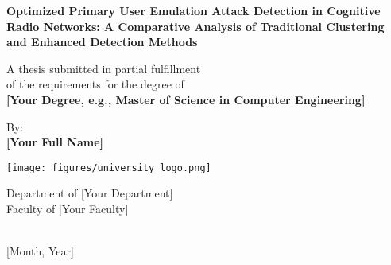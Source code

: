 \begin{titlepage}
    \begin{center}
        \vspace*{1cm}
        
        \Huge
        \textbf{Optimized Primary User Emulation Attack Detection in Cognitive Radio Networks: A Comparative Analysis of Traditional Clustering and Enhanced Detection Methods}
        
        \vspace{1.5cm}
        
        \Large
        A thesis submitted in partial fulfillment\\
        of the requirements for the degree of\\
        \textbf{[Your Degree, e.g., Master of Science in Computer Engineering]}
        
        \vspace{1.5cm}
        
        \Large
        By:\\
        \textbf{[Your Full Name]}
        
        \vfill
        
        \texttt{[image: figures/university\_logo.png]}
        
        \Large
        Department of [Your Department]\\
        Faculty of [Your Faculty]\\
        [Your University]\\
        [University City, Country]
        
        \vspace{0.8cm}
        
        \Large
        [Month, Year]
        
    \end{center}
\end{titlepage}
